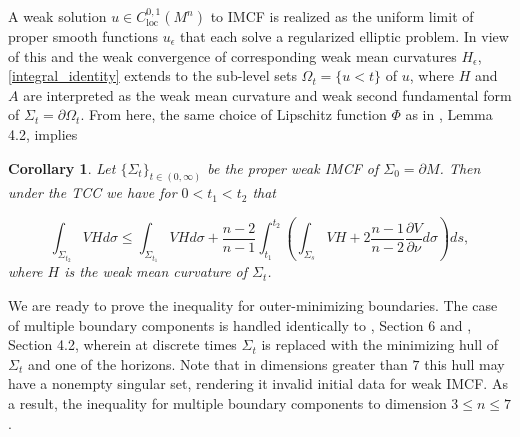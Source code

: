 \documentclass[12pt]{amsart}
\newtheorem{corollary}[theorem]{Corollary}
\theoremstyle{definition}
\numberwithin{equation}{section}
\begin{document}
A weak solution $u \in C^{0,1}_{\text{loc}} (M^{n})$ to IMCF is realized as the uniform limit of proper smooth functions $u_{\epsilon}$ that each solve a regularized elliptic problem. In view of this and the weak convergence of corresponding weak mean curvatures $H_{\epsilon}$, \eqref{integral_identity} extends to the sub-level sets $\Omega_{t} = \{ u < t \}$ of $u$, where $H$ and $A$ are interpreted as the weak mean curvature and weak second fundamental form of $\Sigma_{t}=\partial \Omega_{t}$. From here, the same choice of Lipschitz function $\Phi$ as in \cite{W18}, Lemma 4.2, implies
\begin{corollary} \label{cor}
Let $ \{ \Sigma_{t} \}_{t \in (0,\infty)}$ be the proper weak IMCF of $\Sigma_{0}=\partial M$. Then under the TCC we have for $0 < t_{1} < t_{2}$ that

\begin{equation} \label{VHgrowth}
    \int_{\Sigma_{t_{2}}} VH d\sigma \leq \int_{\Sigma_{t_{1}}} VH d\sigma + \frac{n-2}{n-1} \int_{t_{1}}^{t_{2}} \left( \int_{\Sigma_{s}} VH + 2 \frac{n-1}{n-2} \frac{\partial V}{\partial \nu} d\sigma \right) ds,
\end{equation}
where $H$ is the weak mean curvature of $\Sigma_{t}$.
\end{corollary}
We are ready to prove the inequality for outer-minimizing boundaries. The case of multiple boundary components is handled identically to \cite{HI99}, Section 6 and \cite{W18}, Section 4.2, wherein at discrete times $\Sigma_{t}$ is replaced with the minimizing hull of $\Sigma_{t}$ and one of the horizons. Note that in dimensions greater than $7$ this hull may have a nonempty singular set, rendering it invalid initial data for weak IMCF. As a result, the inequality for multiple boundary components to dimension $3 \leq n \leq 7$.
\end{document}

